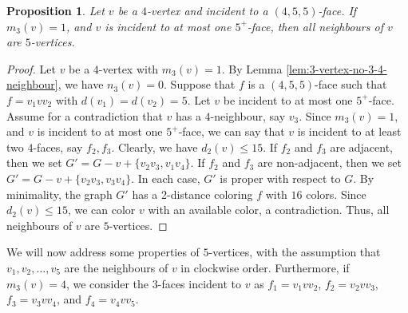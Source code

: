 \documentclass[12pt, reqno]{amsart}
\theoremstyle{plain}
\newtheorem{proposition}[equation]{Proposition}
\theoremstyle{definition}
\numberwithin{equation}{section}
\begin{document}
\begin{proposition}\label{prop:4-vertex-4-5-5-no-4}
Let $v$ be a $4$-vertex and incident to a $(4,5,5)$-face. If $m_3(v)=1$, and $v$ is incident to at most one $5^+$-face, then all neighbours of $v$ are $5$-vertices.
\end{proposition}
\begin{proof}
Let $v$ be a $4$-vertex with  $m_3(v)=1$. %
By Lemma \ref{lem:3-vertex-no-3-4-neighbour}, we have $n_3(v)=0$. Suppose that $f$ is a $(4,5,5)$-face such that $f=v_1vv_2$ with $d(v_1)=d(v_2)=5$. Let $v$ be incident to at most one $5^+$-face. Assume for a contradiction that $v$ has a $4$-neighbour, say $v_3$. Since $m_3(v)=1$, and $v$ is incident to at most one $5^+$-face, we can say that $v$ is incident to at least two $4$-faces, say $f_2,f_3$. Clearly, we have $d_2(v)\leq 15$. If $f_2$ and $f_3$ are adjacent, then  we set $G'=G-v+\{v_2v_3,v_1v_4\}$. If $f_2$ and $f_3$ are non-adjacent, then we set $G'=G-v+\{v_2v_3,v_3v_4\}$. 
In each case,  $G'$ is proper with respect to $G$. By minimality, the graph $G'$ has a 2-distance coloring $f$ with $16$ colors. Since $d_2(v)\leq 15$, we can color $v$ with an available color, a contradiction. Thus, all neighbours of $v$ are $5$-vertices.
\end{proof}

We will now address some properties of $5$-vertices, with the assumption that $v_1, v_2, \ldots, v_5$ are the neighbours of $v$ in clockwise order. Furthermore, if $m_3(v) = 4$, we consider the $3$-faces incident to $v$ as $f_1 = v_1vv_2$, $f_2 = v_2vv_3$, $f_3 = v_3vv_4$, and $f_4 = v_4vv_5$.
\end{document}
